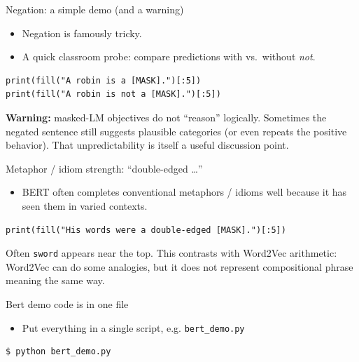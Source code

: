 \documentclass[aspectratio=169]{beamer}
\begin{document}
\begin{frame}[fragile]{Negation: a simple demo (and a warning)}
\begin{itemize}
  \item Negation is famously tricky.
  \item A quick classroom probe: compare predictions with vs.\ without \textit{not}.
\end{itemize}

\begin{verbatim}
print(fill("A robin is a [MASK].")[:5])
print(fill("A robin is not a [MASK].")[:5])
\end{verbatim}

\small
\textbf{Warning:} masked-LM objectives do not “reason” logically.
Sometimes the negated sentence still suggests plausible categories (or even repeats the positive behavior).
That unpredictability is itself a useful discussion point.
\end{frame}

\begin{frame}[fragile]{Metaphor / idiom strength: “double-edged \ldots”}
\begin{itemize}
  \item BERT often completes conventional metaphors / idioms well because it has seen them in varied contexts.
\end{itemize}

\begin{verbatim}
print(fill("His words were a double-edged [MASK].")[:5])
\end{verbatim}

\small
Often \texttt{sword} appears near the top. This contrasts with Word2Vec arithmetic:
Word2Vec can do some analogies, but it does not represent compositional phrase meaning the same way.
\end{frame}

\begin{frame}[fragile]{Bert demo code is in one file}
\begin{itemize}
  \item Put everything in a single script, e.g. \texttt{bert\_demo.py}
\end{itemize}

\begin{verbatim}
$ python bert_demo.py
\end{verbatim}
\end{frame}
\end{document}
